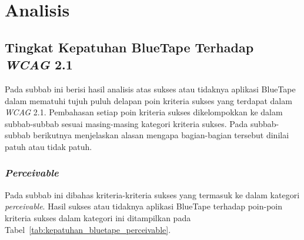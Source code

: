 \chapter{Analisis}
\label{chap:analisis}

\section{Tingkat Kepatuhan BlueTape Terhadap \textit{WCAG} 2.1}
\label{sec:kepatuhan_bluetape_terhadap_wcag_2.1}
Pada subbab ini berisi hasil analisis atas sukses atau tidaknya aplikasi BlueTape dalam mematuhi tujuh puluh delapan poin kriteria sukses yang terdapat dalam \textit{WCAG} 2.1. Pembahasan setiap poin kriteria sukses dikelompokkan ke dalam subbab-subbab sesuai masing-masing kategori kriteria sukses. Pada subbab-subbab berikutnya menjelaskan alasan mengapa bagian-bagian tersebut dinilai patuh atau tidak patuh.

\subsection{\textit{Perceivable}}
\label{subsec:kepatuhan_bluetape_perceivable}
Pada subbab ini dibahas kriteria-kriteria sukses yang termasuk ke dalam kategori \textit{perceivable}. Hasil sukses atau tidaknya aplikasi BlueTape terhadap poin-poin kriteria sukses dalam kategori ini ditampilkan pada \mbox{Tabel \ref{tab:kepatuhan_bluetape_perceivable}}.

